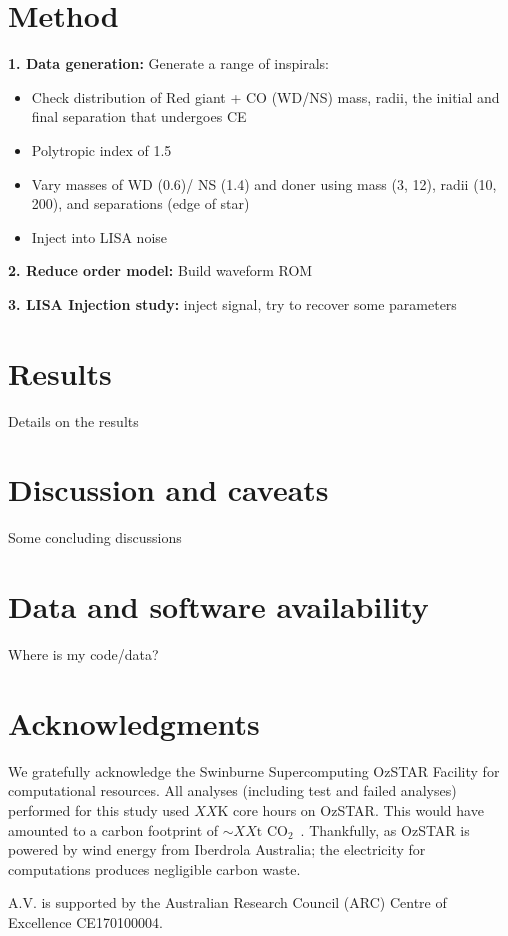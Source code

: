 \documentclass[floatfix,ApJL, twocolumn]{aastex631}
\begin{document}
\section{Method} \label{sec:method}


\textbf{1. Data generation:} Generate a range of inspirals:

\begin{itemize}
    \item Check distribution of Red giant + CO (WD/NS) mass, radii, the initial and final separation that undergoes CE
    \item Polytropic index of 1.5
    \item Vary masses of WD (0.6)/ NS (1.4) and doner using mass (3, 12), radii (10, 200), and separations (edge of star)
    \item Inject into LISA noise
\end{itemize}

\textbf{2. Reduce order model:} Build waveform ROM

\textbf{3. LISA Injection study:} inject signal, try to recover some parameters













\section{Results}\label{sec:results}
Details on the results

\section{Discussion and caveats}\label{sec:conclusion}
Some concluding discussions

\section{Data and software availability}\label{sec:data}
Where is my code/data?






\section*{Acknowledgments}{


We gratefully acknowledge the Swinburne Supercomputing OzSTAR Facility for computational resources. All analyses (including test and failed analyses) performed for this study used $XX$K core hours on OzSTAR. This would have amounted to a carbon footprint of ${\sim XX{\text{t CO}_2}}$~\citep{greenhouse, energy_to_co2_converter}. Thankfully, as OzSTAR is powered by wind energy from Iberdrola Australia; the electricity for computations produces negligible carbon waste.


A.V. is supported by the Australian Research Council (ARC) Centre of Excellence CE170100004.

}
\end{document}
